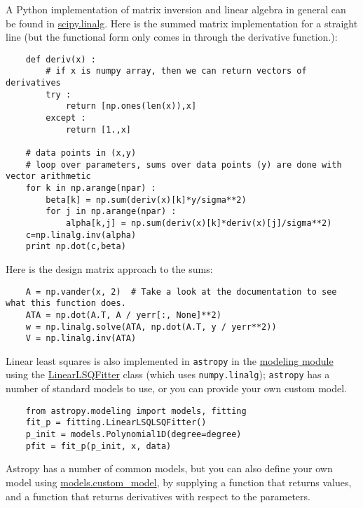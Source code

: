 \documentclass[12pt]{article}
\begin{document}
A Python implementation of matrix inversion and linear algebra in general
can be found in
\href{http://docs.scipy.org/doc/scipy/reference/tutorial/linalg.html}{scipy.linalg}.
Here is the summed matrix implementation for a straight line
(but the functional form only comes in through the derivative function.):
\begin{verbatim}
    def deriv(x) :
        # if x is numpy array, then we can return vectors of derivatives
        try :
            return [np.ones(len(x)),x]
        except :
            return [1.,x]

    # data points in (x,y)
    # loop over parameters, sums over data points (y) are done with vector arithmetic
    for k in np.arange(npar) :
        beta[k] = np.sum(deriv(x)[k]*y/sigma**2)
        for j in np.arange(npar) :
            alpha[k,j] = np.sum(deriv(x)[k]*deriv(x)[j]/sigma**2)
    c=np.linalg.inv(alpha)
    print np.dot(c,beta)
\end{verbatim}

Here is the design matrix approach to the sums:

\begin{verbatim}
    A = np.vander(x, 2)  # Take a look at the documentation to see what this function does.
    ATA = np.dot(A.T, A / yerr[:, None]**2)
    w = np.linalg.solve(ATA, np.dot(A.T, y / yerr**2))
    V = np.linalg.inv(ATA)
\end{verbatim}

Linear least squares is also implemented in \texttt{astropy} in the
\href{http://astropy.readthedocs.org/en/v1.0.6/modeling/index.html}
{modeling module} using the
\href{http://astropy.readthedocs.org/en/v1.0.6/api/astropy.modeling.fitting.LinearLSQFitter.html#astropy.modeling.fitting.LinearLSQFitter}
{LinearLSQFitter} class (which uses \texttt{numpy.linalg});
\texttt{astropy} has a number of standard models to use,
or you can provide your own custom model.

\begin{verbatim}
    from astropy.modeling import models, fitting
    fit_p = fitting.LinearLSQLSQFitter()
    p_init = models.Polynomial1D(degree=degree)
    pfit = fit_p(p_init, x, data)
\end{verbatim}

Astropy has a number of common models, but you can also define your own
model using
\href{http://astronomy.nmsu.edu/holtz/a575/ay575notes/astropy.readthedocs.org/en/v1.0.6/api/astropy.modeling.custom_model.html#astropy.modeling.custom_model}
{models.custom\_model}, by supplying a function that returns
values, and a function that returns derivatives with respect to the
parameters.
\end{document}
